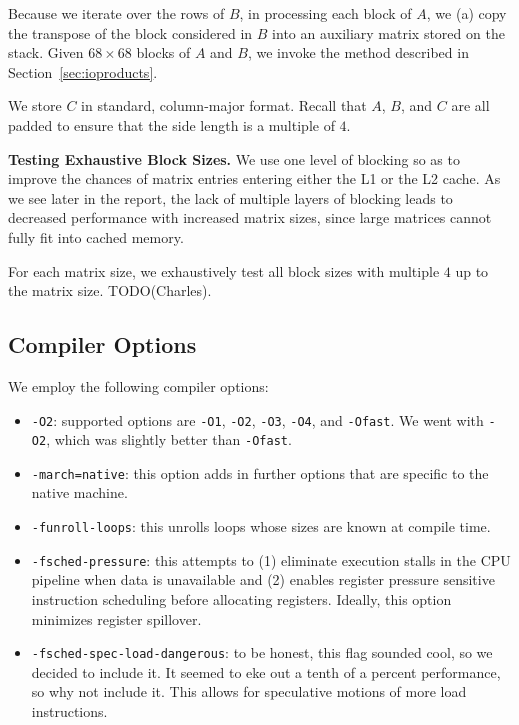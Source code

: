 \documentclass{article} %
\begin{document}
Because we iterate over the rows of $B$, in processing
each block of $A$, we (a) copy the transpose of the block considered in $B$ into
an auxiliary matrix stored on the stack. Given $68\times 68$ blocks of $A$ and
$B$, we invoke the method described in Section~\ref{sec:ioproducts}.

We store $C$ in standard, column-major format. Recall that $A$, $B$, and $C$
are all padded to ensure that the side length is a multiple of $4$.

\textbf{Testing Exhaustive Block Sizes.} We use one level of blocking so as to
improve the chances of matrix entries entering either the L1 or the L2 cache. As
we see later in the report, the lack of multiple layers of blocking leads to
decreased performance with increased matrix sizes, since large matrices cannot
fully fit into cached memory.

For each matrix size, we exhaustively test all block sizes with multiple $4$ up
to the matrix size. TODO(Charles).

\subsection{Compiler Options}
We employ the following compiler options:
\begin{itemize}
  \item \texttt{-O2}: supported options are \texttt{-O1}, \texttt{-O2},
    \texttt{-O3}, \texttt{-O4}, and \texttt{-Ofast}.
    We went with \texttt{-O2}, which was slightly better than \texttt{-Ofast}.
  \item \texttt{-march=native}: this option adds in further options that are
    specific to the native machine.
  \item \texttt{-funroll-loops}: this unrolls loops whose sizes are known at
    compile time.
  \item \texttt{-fsched-pressure}: this attempts to (1) eliminate execution
    stalls in the CPU pipeline when data is unavailable and (2) enables register
    pressure sensitive instruction scheduling before allocating registers.
    Ideally, this option minimizes register spillover.
  \item \texttt{-fsched-spec-load-dangerous}: to be honest, this flag sounded
    cool, so we decided to include it. It seemed to eke out a tenth of a percent
    performance, so why not include it. This allows for speculative motions of
    more load instructions.
\end{itemize}
\end{document}
